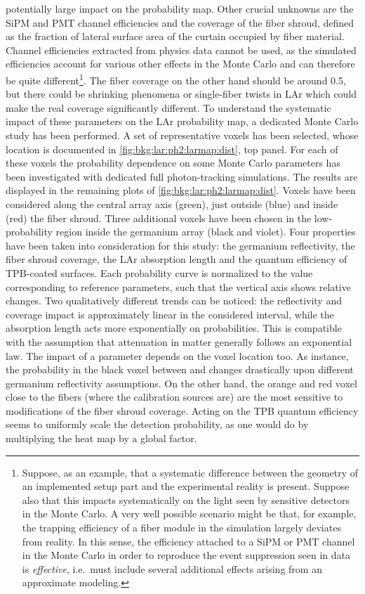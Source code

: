 potentially large impact on the probability map. Other crucial unknowns are the SiPM and PMT
channel efficiencies and the coverage of the fiber shroud, defined as the fraction of
lateral surface area of the curtain occupied by fiber material. Channel efficiencies
extracted from physics data cannot be used, as the simulated efficiencies account for
various other effects in the Monte Carlo and can therefore be quite
different\footnote{\label{footnote:bkg:lar:ph2:mc-eff}%
  Suppose, as an example, that a systematic difference between the geometry of an
  implemented setup part and the experimental reality is present. Suppose also that this
  impacts systematically on the light seen by sensitive detectors in the Monte Carlo. A
  very well possible scenario might be that, for example, the trapping efficiency of a
  fiber module in the simulation largely deviates from reality. In this sense, the
  efficiency attached to a SiPM or PMT channel in the Monte Carlo in order to reproduce
  the event suppression seen in data is \emph{effective}, i.e.~must include several
  additional effects arising from an approximate modeling.
}. The fiber coverage on the other hand should be around 0.5, but there could be shrinking
phenomena or single-fiber twists in LAr which could make the real coverage significantly
different.
\newpar
To understand the systematic impact of these parameters on the LAr probability map, a
dedicated Monte Carlo study has been performed. A set of representative voxels has been
selected, whose location is documented in \cref{fig:bkg:lar:ph2:larmap:dist}, top panel.
For each of these voxels the probability dependence on some Monte Carlo parameters has
been investigated with dedicated full photon-tracking simulations. The results are
displayed in the remaining plots of \cref{fig:bkg:lar:ph2:larmap:dist}. Voxels have been
considered along the central array axis (green), just outside (blue) and inside (red) the
fiber shroud. Three additional voxels have been chosen in the low-probability region
inside the germanium array (black and violet). Four properties have been taken into
consideration for this study: the germanium reflectivity, the fiber shroud coverage,
the LAr absorption length and the quantum efficiency of TPB-coated surfaces. Each
probability curve is normalized to the value corresponding to reference parameters, such
that the vertical axis shows relative changes. Two qualitatively different trends can be
noticed: the reflectivity and coverage impact is approximately linear in the considered
interval, while the absorption length acts more exponentially on probabilities.  This is
compatible with the assumption that attenuation in matter generally follows an exponential
law. The impact of a parameter depends on the voxel location too. As instance, the
probability in the black voxel between  and  changes drastically upon
different germanium reflectivity assumptions. On the other hand, the orange and red voxel
close to the fibers (where the calibration sources are) are the most sensitive to
modifications of the fiber shroud coverage. Acting on the TPB quantum efficiency seems to
uniformly scale the detection probability, as one would do by multiplying the heat map by
a global factor.


